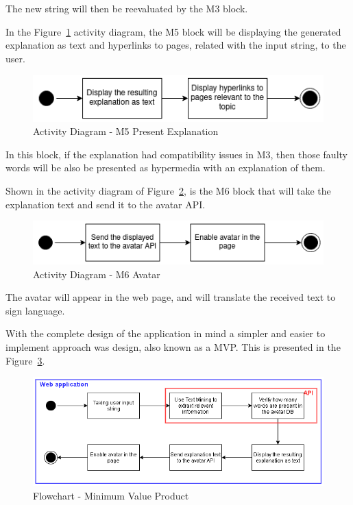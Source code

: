The new string will then be reevaluated by the M3 block.

In the Figure~\ref{fig:M5} activity diagram, the M5 block will be displaying the generated explanation as text and hyperlinks to pages, related with the input string, to the user.

\begin{figure}[H]
\centering
\includegraphics[width=\textwidth,keepaspectratio]{ch4/assets/M5.png}
\caption[Activity Diagram Present Explanation Module]{Activity Diagram - M5 Present Explanation}
\label{fig:M5}
\end{figure}

In this block, if the explanation had compatibility issues in M3, then those faulty words will be also be presented as hypermedia with an explanation of them.

Shown in the activity diagram of Figure~\ref{fig:M6}, is the M6 block that will take the explanation text and send it to the avatar \gls{API}.

\begin{figure}[H]
\centering
\includegraphics[width=\textwidth,keepaspectratio]{ch4/assets/M6.png}
\caption[Activity Diagram Avatar Module]{Activity Diagram - M6 Avatar}
\label{fig:M6}
\end{figure}

The avatar will appear in the web page, and will translate the received text to sign language.

With the complete design of the application in mind a simpler and easier to implement approach was design, also known as a \gls{MVP}.
This is presented in the Figure~\ref{fig:mvp}.

\begin{figure}[H]
\centering
\includegraphics[width=\textwidth,keepaspectratio]{ch4/assets/mvp_2.png}
\caption[Flowchart Minimun Value Product]{Flowchart - Minimum Value Product}
\label{fig:mvp}
\end{figure}

